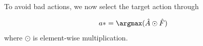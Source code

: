 \documentclass[11pt,a4paper]{article}
\begin{document}
To avoid bad actions, we now select the target action through

\begin{equation}
    a* = \argmax(\hat{A}\odot\hat{F})
\end{equation}
where $\odot$ is element-wise multiplication.









\end{document}
